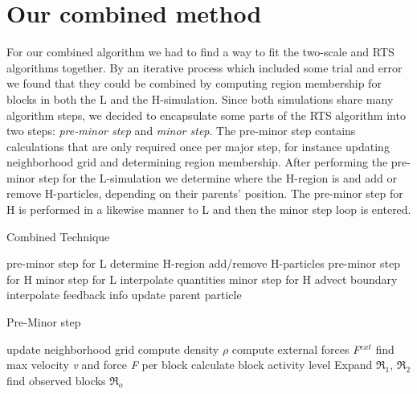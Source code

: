 \documentclass[../../main.tex]{subfiles}
\begin{document}
\tracingall



\section{Our combined method}


For our combined algorithm we had to find a way to fit the two-scale and RTS algorithms together. By an iterative process which included some trial and error we found that they could be combined by computing region membership for blocks in both the L and the H-simulation. Since both simulations share many algorithm steps, we decided to encapsulate some parts of the RTS algorithm into two steps: \textit{pre-minor step} and \textit{minor step}. The pre-minor step contains calculations that are only required once per major step, for instance updating neighborhood grid and determining region membership. After performing the pre-minor step for the L-simulation we determine where the H-region is and add or remove H-particles, depending on their parents' position. The pre-minor step for H is performed in a likewise manner to L and then the minor step loop is entered. 

\begin{algorithm}[h]
    \caption{Combined Technique}
    \label{alg:combined:main}
    \begin{algorithmic}[1]
            \State pre-minor step for L
            \State determine H-region
            \State add/remove H-particles
            \State pre-minor step for H
                \State minor step for L
                \State interpolate quantities
                  \State minor step for H
                  \State advect boundary
                \EndFor
            \State interpolate feedback info
            \EndFor
            \State update parent particle
        \EndWhile
   \end{algorithmic}
\end{algorithm}


\begin{algorithm}[h]
    \caption{Pre-Minor step}
    \label{alg:combined:preminorstep}
    \begin{algorithmic}[1]
    \State update neighborhood grid
    \State compute density $\rho$
    \State compute external forces \textit{F}$^{ext}$
    \State find max velocity \textit{v} and force \textit{F} per block
    \State calculate block activity level
    \State Expand $\Re$$_1$, $\Re$$_2$
    \State find observed blocks $\Re$$_o$
   \end{algorithmic}
\end{algorithm}
\end{document}
